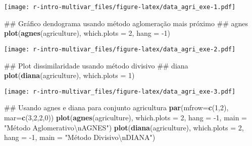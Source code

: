 \documentclass[]{book}
\newenvironment{Shaded}{\begin{snugshade}}{\end{snugshade}}
\newcommand{\KeywordTok}[1]{\textcolor[rgb]{0.13,0.29,0.53}{\textbf{{#1}}}}
\newcommand{\DataTypeTok}[1]{\textcolor[rgb]{0.13,0.29,0.53}{{#1}}}
\newcommand{\DecValTok}[1]{\textcolor[rgb]{0.00,0.00,0.81}{{#1}}}
\newcommand{\CharTok}[1]{\textcolor[rgb]{0.31,0.60,0.02}{{#1}}}
\newcommand{\StringTok}[1]{\textcolor[rgb]{0.31,0.60,0.02}{{#1}}}
\newcommand{\NormalTok}[1]{{#1}}
\begin{document}
\texttt{[image: r-intro-multivar\_files/figure-latex/data\_agri\_exe-1.pdf]}

\begin{Shaded}
\begin{Highlighting}[]
\NormalTok{## Gráfico dendograma usando método aglomeração mais próximo}
\NormalTok{## agnes}
\KeywordTok{plot}\NormalTok{(}\KeywordTok{agnes}\NormalTok{(agriculture), }\DataTypeTok{which.plots =} \DecValTok{2}\NormalTok{, }\DataTypeTok{hang =} \NormalTok{-}\DecValTok{1}\NormalTok{)}
\end{Highlighting}
\end{Shaded}

\texttt{[image: r-intro-multivar\_files/figure-latex/data\_agri\_exe-2.pdf]}

\begin{Shaded}
\begin{Highlighting}[]
\NormalTok{## Plot dissimilaridade usando método divisivo}
\NormalTok{## diana}
\KeywordTok{plot}\NormalTok{(}\KeywordTok{diana}\NormalTok{(agriculture), }\DataTypeTok{which.plots =} \DecValTok{1}\NormalTok{)}
\end{Highlighting}
\end{Shaded}

\texttt{[image: r-intro-multivar\_files/figure-latex/data\_agri\_exe-3.pdf]}

\begin{Shaded}
\begin{Highlighting}[]
\NormalTok{## Usando agnes e diana para conjunto agricultura}
\KeywordTok{par}\NormalTok{(}\DataTypeTok{mfrow=}\KeywordTok{c}\NormalTok{(}\DecValTok{1}\NormalTok{,}\DecValTok{2}\NormalTok{), }\DataTypeTok{mar=}\KeywordTok{c}\NormalTok{(}\DecValTok{3}\NormalTok{,}\DecValTok{2}\NormalTok{,}\DecValTok{2}\NormalTok{,}\DecValTok{0}\NormalTok{))}
\KeywordTok{plot}\NormalTok{(}\KeywordTok{agnes}\NormalTok{(agriculture), }\DataTypeTok{which.plots =} \DecValTok{2}\NormalTok{, }\DataTypeTok{hang =} \NormalTok{-}\DecValTok{1}\NormalTok{,}
     \DataTypeTok{main =} \StringTok{"Método Aglomerativo}\CharTok{\textbackslash{}n}\StringTok{AGNES"}\NormalTok{)}
\KeywordTok{plot}\NormalTok{(}\KeywordTok{diana}\NormalTok{(agriculture), }\DataTypeTok{which.plots =} \DecValTok{2}\NormalTok{, }\DataTypeTok{hang =} \NormalTok{-}\DecValTok{1}\NormalTok{,}
     \DataTypeTok{main =} \StringTok{"Método Divisivo}\CharTok{\textbackslash{}n}\StringTok{DIANA"}\NormalTok{)}
\end{Highlighting}
\end{Shaded}
\end{document}
